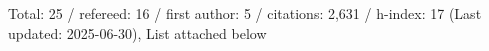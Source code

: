 Total: 25 / refereed: 16 / first author: 5 / citations: 2,631 / h-index: 17 (Last updated: 2025-06-30), List attached below